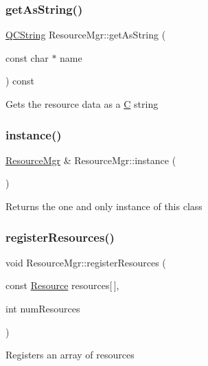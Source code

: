 \subsubsection{\texorpdfstring{getAsString()}{getAsString()}}
{\footnotesize\ttfamily \mbox{\hyperlink{class_q_c_string}{Q\+C\+String}} Resource\+Mgr\+::get\+As\+String (\begin{DoxyParamCaption}\item[{const char $\ast$}]{name }\end{DoxyParamCaption}) const}

Gets the resource data as a \mbox{\hyperlink{class_c}{C}} string \mbox{\label{class_resource_mgr_a02fb3176893696eaf659d680c8b08064}} 
\subsubsection{\texorpdfstring{instance()}{instance()}}
{\footnotesize\ttfamily \mbox{\hyperlink{class_resource_mgr}{Resource\+Mgr}} \& Resource\+Mgr\+::instance (\begin{DoxyParamCaption}{ }\end{DoxyParamCaption})\hspace{0.3cm}{\ttfamily [static]}}

Returns the one and only instance of this class \mbox{\label{class_resource_mgr_a2894f6f64a5376dfc475bde3f8acd0f3}} 
\subsubsection{\texorpdfstring{registerResources()}{registerResources()}}
{\footnotesize\ttfamily void Resource\+Mgr\+::register\+Resources (\begin{DoxyParamCaption}\item[{const \mbox{\hyperlink{struct_resource}{Resource}}}]{resources\mbox{[}$\,$\mbox{]},  }\item[{int}]{num\+Resources }\end{DoxyParamCaption})}

Registers an array of resources \mbox{\label{class_resource_mgr_a5596fb3e70044fa98520b4d95d5336e1}} 
